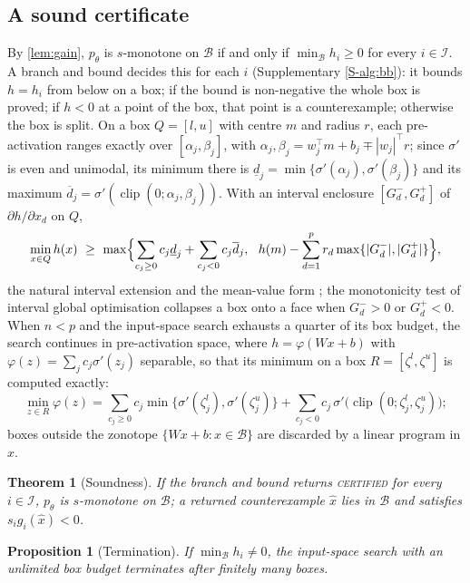 \documentclass[preprint,12pt,authoryear]{elsarticle}
\newtheorem{proposition}{Proposition}
\newtheorem{theorem}{Theorem}
\newcommand{\B}{\mathcal{B}}
\newcommand{\I}{\mathcal{I}}
\newcommand{\sig}{\sigma}
\DeclareMathOperator{\clip}{clip}
\begin{document}
\subsection{A sound certificate}\label{sec:certificate}
By \cref{lem:gain}, $p_\theta$ is $s$-monotone on $\B$ if and only if $\min_\B h_i\ge0$ for every $i\in\I$. A branch and
bound decides this for each $i$ (Supplementary \cref{S-alg:bb}): it bounds $h=h_i$ from below on a box; if the bound is
non-negative the whole box is proved; if $h<0$ at a point of the box, that point is a counterexample; otherwise the box
is split. On a box $Q=[l,u]$ with centre $m$ and radius $r$, each pre-activation ranges exactly over
$[\alpha_j,\beta_j]$, with $\alpha_j,\beta_j=w_j^\top m+b_j\mp|w_j|^\top r$; since $\sig'$ is even and unimodal, its
minimum there is $\underline{d}_j=\min\{\sig'(\alpha_j),\sig'(\beta_j)\}$ and its maximum
$\overline{d}_j=\sig'(\clip(0;\alpha_j,\beta_j))$. With an interval enclosure $[G^-_d,G^+_d]$ of $\partial h/\partial x_d$
on $Q$,
\begin{equation}\label{eq:lbx}
\min_{x\in Q}h(x)\ \ge\ \max\Bigl\{\sum_{c_j\ge0}c_j\underline{d}_j+\sum_{c_j<0}c_j\overline{d}_j,\ \
h(m)-\sum_{d=1}^{p}r_d\max\{|G^-_d|,|G^+_d|\}\Bigr\},
\end{equation}
the natural interval extension and the mean-value form \citep{Moore2009}; the monotonicity test of interval global
optimisation \citep{HansenWalster2004} collapses a box onto a face when $G^-_d>0$ or $G^+_d<0$. When $n<p$ and the input-space search
exhausts a quarter of its box budget, the search continues in pre-activation space, where $h=\varphi(Wx+b)$ with $\varphi(z)=\sum_jc_j\sig'(z_j)$ separable, so that its minimum on a box
$R=[\zeta^l,\zeta^u]$ is computed exactly:
\begin{equation}\label{eq:lbz}
\min_{z\in R}\varphi(z)=\sum_{c_j\ge0}c_j\min\{\sig'(\zeta^l_j),\sig'(\zeta^u_j)\}+\sum_{c_j<0}c_j\,\sig'\bigl(\clip(0;\zeta^l_j,\zeta^u_j)\bigr);
\end{equation}
boxes outside the zonotope $\{Wx+b:x\in\B\}$ are discarded by a linear program in $x$.

\begin{theorem}[Soundness]\label{thm:sound}
If the branch and bound returns \textsc{certified} for every $i\in\I$, $p_\theta$ is $s$-monotone on $\B$; a returned
counterexample $\hat x$ lies in $\B$ and satisfies $s_ig_i(\hat x)<0$.
\end{theorem}

\begin{proposition}[Termination]\label{prop:term}
If $\min_\B h_i\neq0$, the input-space search with an unlimited box budget terminates after finitely many boxes.
\end{proposition}
\end{document}
